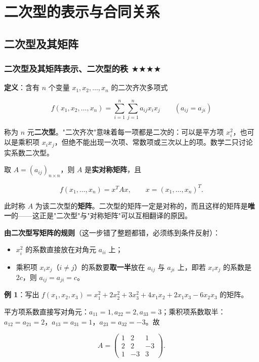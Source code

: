 \documentclass[11pt,openany,UTF8]{ctexbook}
\begin{document}
\section{二次型的表示与合同关系}

\subsection{二次型及其矩阵}

\subsubsection{二次型及其矩阵表示、二次型的秩 $\bigstar$$\bigstar$$\bigstar$$\bigstar$}

\textbf{定义}：含有 $n$ 个变量 $x_1,x_2,\dots,x_n$ 的二次齐次多项式

\[f(x_1,x_2,\dots,x_n)=\sum_{i=1}^{n}\sum_{j=1}^{n}a_{ij}x_ix_j\qquad(a_{ij}=a_{ji})\]

称为 $n$ 元\textbf{二次型}。"二次齐次"意味着每一项都是二次的：可以是平方项 $x_i^2$，也可以是乘积项 $x_ix_j$，但绝不能出现一次项、常数项或三次以上的项。数学二只讨论实系数二次型。

取 $A=(a_{ij})_{n\times n}$，则 $A$ 是\textbf{实对称矩阵}，且

\[f(x_1,\dots,x_n)=x^TAx,\qquad x=(x_1,\dots,x_n)^T .\]

此时称 $A$ 为该二次型的\textbf{矩阵}。二次型的矩阵一定是对称的，而且这样的矩阵是\textbf{唯一}的——这正是"二次型"与"对称矩阵"可以互相翻译的原因。

\textbf{由二次型写矩阵的规则}（这一步错了整题都错，必须练到条件反射）：

\begin{itemize}
\item $x_i^2$ 的系数直接放在对角元 $a_{ii}$ 上；
\item 乘积项 $x_ix_j$（$i\neq j$）的系数要\textbf{取一半}放在 $a_{ij}$ 与 $a_{ji}$ 上，即若 $x_ix_j$ 的系数是 $2c$，则 $a_{ij}=a_{ji}=c$。
\end{itemize}
\textbf{例 1}：写出 $f(x_1,x_2,x_3)=x_1^2+2x_2^2+3x_3^2+4x_1x_2+2x_1x_3-6x_2x_3$ 的矩阵。

平方项系数直接写对角元：$a_{11}=1,a_{22}=2,a_{33}=3$；乘积项系数取半：$a_{12}=a_{21}=2$，$a_{13}=a_{31}=1$，$a_{23}=a_{32}=-3$。故

\[A=\begin{pmatrix}1&2&1\\2&2&-3\\1&-3&3\end{pmatrix}.\]
\end{document}
